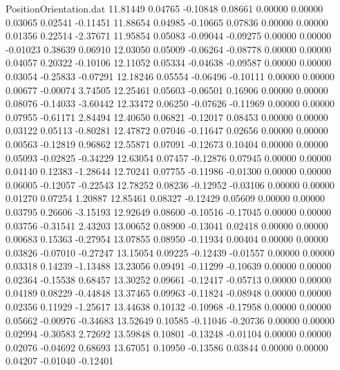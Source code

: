 \begin{filecontents}{PositionOrientation.dat}
  11.81449    0.04765   -0.10848     0.08661    0.00000    0.00000    0.03065    0.02541   -0.11451
  11.88654    0.04985   -0.10665     0.07836    0.00000    0.00000    0.01356    0.22514   -2.37671
  11.95854    0.05083   -0.09044    -0.09275    0.00000    0.00000   -0.01023    0.38639    0.06910
  12.03050    0.05009   -0.06264    -0.08778    0.00000    0.00000    0.04057    0.20322   -0.10106
  12.11052    0.05334   -0.04638    -0.09587    0.00000    0.00000    0.03054   -0.25833   -0.07291
  12.18246    0.05554   -0.06496    -0.10111    0.00000    0.00000    0.00677   -0.00074    3.74505
  12.25461    0.05603   -0.06501     0.16906    0.00000    0.00000    0.08076   -0.14033   -3.60442
  12.33472    0.06250   -0.07626    -0.11969    0.00000    0.00000    0.07955   -0.61171    2.84494
  12.40650    0.06821   -0.12017     0.08453    0.00000    0.00000    0.03122    0.05113   -0.80281
  12.47872    0.07046   -0.11647     0.02656    0.00000    0.00000    0.00563   -0.12819    0.96862
  12.55871    0.07091   -0.12673     0.10404    0.00000    0.00000    0.05093   -0.02825   -0.34229
  12.63054    0.07457   -0.12876     0.07945    0.00000    0.00000    0.04140    0.12383   -1.28644
  12.70241    0.07755   -0.11986    -0.01300    0.00000    0.00000    0.06005   -0.12057   -0.22543
  12.78252    0.08236   -0.12952    -0.03106    0.00000    0.00000    0.01270    0.07254    1.20887
  12.85461    0.08327   -0.12429     0.05609    0.00000    0.00000    0.03795    0.26606   -3.15193
  12.92649    0.08600   -0.10516    -0.17045    0.00000    0.00000    0.03756   -0.31541    2.43203
  13.00652    0.08900   -0.13041     0.02418    0.00000    0.00000    0.00683    0.15363   -0.27954
  13.07855    0.08950   -0.11934     0.00404    0.00000    0.00000    0.03826   -0.07010   -0.27247
  13.15054    0.09225   -0.12439    -0.01557    0.00000    0.00000    0.03318    0.14239   -1.13488
  13.23056    0.09491   -0.11299    -0.10639    0.00000    0.00000    0.02364   -0.15538    0.68457
  13.30252    0.09661   -0.12417    -0.05713    0.00000    0.00000    0.04189    0.08229   -0.44848
  13.37465    0.09963   -0.11824    -0.08948    0.00000    0.00000    0.02356    0.11929   -1.25617
  13.44638    0.10132   -0.10968    -0.17958    0.00000    0.00000    0.05662   -0.00976   -0.34683
  13.52649    0.10585   -0.11046    -0.20736    0.00000    0.00000    0.02994   -0.30583    2.72692
  13.59848    0.10801   -0.13248    -0.01104    0.00000    0.00000    0.02076   -0.04692    0.68693
  13.67051    0.10950   -0.13586     0.03844    0.00000    0.00000    0.04207   -0.01040   -0.12401

\end{filecontents}
